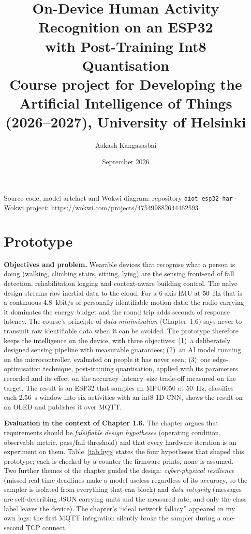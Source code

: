 \documentclass[10pt,a4paper]{article}
\title{\vspace{-14mm}\textbf{On-Device Human Activity Recognition on an ESP32\\with Post-Training Int8 Quantisation}\\[3pt]
\normalsize Course project for Developing the Artificial Intelligence of Things (2026--2027), University of Helsinki}
\author{\normalsize Aakash Kangasasbai}
\date{\normalsize September 2026}
\begin{document}
\maketitle
\vspace{-10mm}
\begin{center}\small
Source code, model artefact and Wokwi diagram: repository \texttt{aiot-esp32-har} \quad$\cdot$\quad
Wokwi project: \url{https://wokwi.com/projects/475499882644462593}
\end{center}

\section{Prototype}

\textbf{Objectives and problem.} Wearable devices that recognise what a person is doing (walking, climbing stairs, sitting, lying) are the sensing front-end of fall detection, rehabilitation logging and context-aware building control. The na\"ive design streams raw inertial data to the cloud. For a 6-axis IMU at \SI{50}{\hertz} that is a continuous \SI{4.8}{kbit/s} of personally identifiable motion data; the radio carrying it dominates the energy budget and the round trip adds seconds of response latency. The course's principle of \emph{data minimisation} (Chapter~1.6) says never to transmit raw identifiable data when it can be avoided. The prototype therefore keeps the intelligence on the device, with three objectives: (1)~a deliberately designed sensing pipeline with measurable guarantees; (2)~an AI model running on the microcontroller, evaluated on people it has never seen; (3)~one edge-optimisation technique, post-training quantisation, applied with its parameters recorded and its effect on the accuracy--latency--size trade-off measured on the target. The result is an ESP32 that samples an MPU6050 at \SI{50}{\hertz}, classifies each \SI{2.56}{\second} window into six activities with an int8 1D-CNN, shows the result on an OLED and publishes it over MQTT.

\textbf{Evaluation in the context of Chapter 1.6.} The chapter argues that requirements should be \emph{falsifiable design hypotheses} (operating condition, observable metric, pass/fail threshold) and that every hardware iteration is an experiment on them. Table~\ref{tab:hyp} states the four hypotheses that shaped this prototype; each is checked by a counter the firmware prints, none is assumed. Two further themes of the chapter guided the design: \emph{cyber-physical resilience} (missed real-time deadlines make a model useless regardless of its accuracy, so the sampler is isolated from everything that can block) and \emph{data integrity} (messages are self-describing JSON carrying units and the measured rate, and only the class label leaves the device). The chapter's ``ideal network fallacy'' appeared in my own logs: the first MQTT integration silently broke the sampler during a one-second TCP connect.
\end{document}
